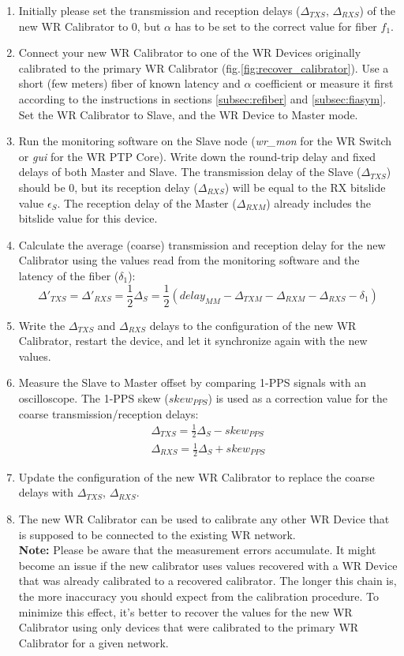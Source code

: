 \begin{enumerate}
	\item Initially please set the transmission and reception delays
		($\Delta_{TXS}$, $\Delta_{RXS}$) of the new WR Calibrator to 0, but $\alpha$ has
		to be set to the correct value for fiber $f_1$.
	\item Connect your new WR Calibrator to one of the WR Devices originally
		calibrated to the primary WR Calibrator
		(fig.\ref{fig:recover_calibrator}). Use a short (few meters) fiber of known
		latency and $\alpha$ coefficient or measure it first according to the
		instructions in sections \ref{subsec:refiber} and \ref{subsec:fiasym}. Set
		the WR Calibrator to Slave, and the WR Device to Master mode.
	\item Run the monitoring software on the Slave node (\emph{wr\_mon} for the WR
		Switch or \emph{gui} for the WR PTP Core). Write down the round-trip
		delay and fixed delays of both Master and Slave. The transmission delay of
		the Slave ($\Delta_{TXS}$) should be 0, but its reception delay
		($\Delta_{RXS}$) will be equal to the RX bitslide value $\epsilon_S$. The
		reception delay of the Master ($\Delta_{RXM}$) already includes the bitslide
		value for this device.
	\item Calculate the average (coarse) transmission and reception delay for the
		new Calibrator using the values read from the monitoring software and the
		latency of the fiber ($\delta_1$):
	\begin{equation}
		\Delta'_{TXS} = \Delta'_{RXS} = \frac{1}{2}\Delta_S = \frac{1}{2}(delay_{MM} - \Delta_{TXM} - \Delta_{RXM} - \Delta_{RXS} - \delta_1)
	\end{equation}
	\item Write the $\Delta_{TXS}$ and $\Delta_{RXS}$ delays to the configuration
		of the new WR Calibrator, restart the device, and let it synchronize again
		with the new values.
	\item Measure the Slave to Master offset by comparing 1-PPS signals with an
    oscilloscope. The 1-PPS skew ($skew_{PPS}$) is used as
    a correction value for the coarse transmission/reception delays:
	\begin{align}
		\Delta_{TXS} = \frac{1}{2}\Delta_S - skew_{PPS}\\
		\Delta_{RXS} = \frac{1}{2}\Delta_S + skew_{PPS}
	\end{align}
	\item Update the configuration of the new WR Calibrator to replace the coarse
		delays with $\Delta_{TXS}$, $\Delta_{RXS}$.
	\item The new WR Calibrator can be used to calibrate any other WR Device that is
		supposed to be connected to the existing WR network.\\[12pt]
	{\bf Note:} Please be aware that the measurement errors accumulate. It might
	become an issue if the new calibrator uses values recovered with a WR Device
	that was already calibrated to a recovered calibrator. The longer this chain
	is, the more inaccuracy you should expect from the calibration procedure. To
	minimize this effect, it's better to recover the values for the new WR
	Calibrator using only devices that were calibrated to the primary WR
	Calibrator for a given network.
\end{enumerate}
